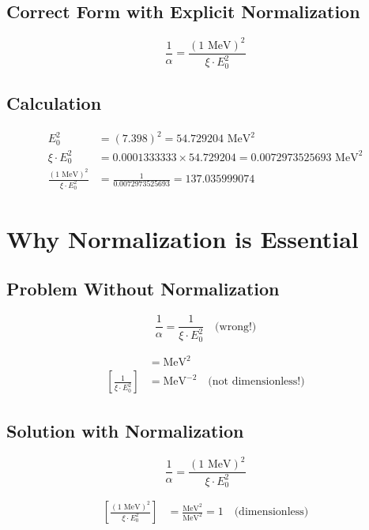 	\subsection*{Correct Form with Explicit Normalization}
	
	\[
	\boxed{\frac{1}{\alpha} = \frac{(1 \text{ MeV})^2}{\xi \cdot E_0^2}}
	\]
	
	\subsection*{Calculation}
	
	\begin{align*}
		E_0^2 &= (7.398)^2 = 54.729204 \text{ MeV}^2 \\
		\xi \cdot E_0^2 &= 0.0001333333 \times 54.729204 = 0.0072973525693 \text{ MeV}^2 \\
		\frac{(1 \text{ MeV})^2}{\xi \cdot E_0^2} &= \frac{1}{0.0072973525693} = 137.035999074
	\end{align*}
	
	\section*{Why Normalization is Essential}
	
	\subsection*{Problem Without Normalization}
	
	\[
	\frac{1}{\alpha} = \frac{1}{\xi \cdot E_0^2} \quad \text{(wrong!)}
	\]
	
	\begin{align*}
		[\xi \cdot E_0^2] &= \text{MeV}^2 \\
		\left[\frac{1}{\xi \cdot E_0^2}\right] &= \text{MeV}^{-2} \quad \text{(not dimensionless!)}
	\end{align*}
	
	\subsection*{Solution with Normalization}
	
	\[
	\frac{1}{\alpha} = \frac{(1 \text{ MeV})^2}{\xi \cdot E_0^2}
	\]
	
	\begin{align*}
		\left[\frac{(1 \text{ MeV})^2}{\xi \cdot E_0^2}\right] &= \frac{\text{MeV}^2}{\text{MeV}^2} = 1 \quad \text{(dimensionless)}
	\end{align*}
	

